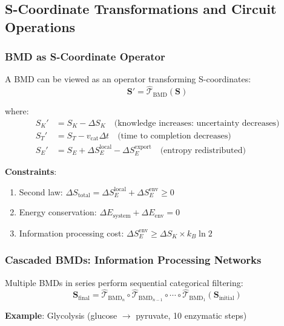 \documentclass[11pt,a4paper]{article}
\begin{document}
\subsection{S-Coordinate Transformations and Circuit Operations}

\subsubsection{BMD as S-Coordinate Operator}

A BMD can be viewed as an operator transforming S-coordinates:
\begin{equation}
\mathbf{S}' = \hat{\mathcal{T}}_{\text{BMD}}(\mathbf{S})
\end{equation}

where:
\begin{align}
S_K' &= S_K - \Delta S_K \quad \text{(knowledge increases: uncertainty decreases)} \\
S_T' &= S_T - v_{\text{cat}} \Delta t \quad \text{(time to completion decreases)} \\
S_E' &= S_E + \Delta S_E^{\text{local}} - \Delta S_E^{\text{export}} \quad \text{(entropy redistributed)}
\end{align}

\textbf{Constraints}:
\begin{enumerate}
\item Second law: $\Delta S_{\text{total}} = \Delta S_E^{\text{local}} + \Delta S_E^{\text{env}} \geq 0$
\item Energy conservation: $\Delta E_{\text{system}} + \Delta E_{\text{env}} = 0$
\item Information processing cost: $\Delta S_E^{\text{env}} \geq \Delta S_K \times k_B \ln 2$
\end{enumerate}

\subsubsection{Cascaded BMDs: Information Processing Networks}

Multiple BMDs in series perform sequential categorical filtering:
\begin{equation}
\mathbf{S}_{\text{final}} = \hat{\mathcal{T}}_{\text{BMD}_n} \circ \hat{\mathcal{T}}_{\text{BMD}_{n-1}} \circ \cdots \circ \hat{\mathcal{T}}_{\text{BMD}_1}(\mathbf{S}_{\text{initial}})
\end{equation}

\textbf{Example}: Glycolysis (glucose $\to$ pyruvate, 10 enzymatic steps)
\end{document}
